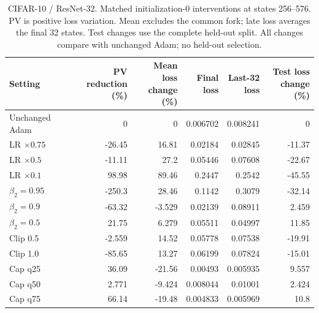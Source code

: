 \begin{table}[t]
\centering
\small
\setlength{\tabcolsep}{4pt}
\begin{tabular}{lrrrrr}
\toprule
Setting & \shortstack{PV reduction\\(\%)} & \shortstack{Mean loss\\change (\%)} & \shortstack{Final\\loss} & \shortstack{Last-32\\loss} & \shortstack{Test loss\\change (\%)} \\
\midrule
Unchanged Adam & 0 & 0 & 0.006702 & 0.008241 & 0 \\
LR $\times0.75$ & -26.45 & 16.81 & 0.02184 & 0.02845 & -11.37 \\
LR $\times0.5$ & -11.11 & 27.2 & 0.05446 & 0.07608 & -22.67 \\
LR $\times0.1$ & 98.98 & 89.46 & 0.2447 & 0.2542 & -45.55 \\
$\beta_2=0.95$ & -250.3 & 28.46 & 0.1142 & 0.3079 & -32.14 \\
$\beta_2=0.9$ & -63.32 & -3.529 & 0.02139 & 0.08911 & 2.459 \\
$\beta_2=0.5$ & 21.75 & 6.279 & 0.05511 & 0.04997 & 11.85 \\
Clip 0.5 & -2.559 & 14.52 & 0.05778 & 0.07538 & -19.91 \\
Clip 1.0 & -85.65 & 13.27 & 0.06199 & 0.07824 & -15.01 \\
Cap q25 & 36.09 & -21.56 & 0.00493 & 0.005935 & 9.557 \\
Cap q50 & 2.771 & -9.424 & 0.008044 & 0.01001 & 2.424 \\
Cap q75 & 66.14 & -19.48 & 0.004833 & 0.005969 & 10.8 \\
\bottomrule
\end{tabular}
\caption{CIFAR-10 / ResNet-32. Matched initialization-0 interventions at states 256--576. PV is positive loss variation. Mean excludes the common fork; late loss averages the final 32 states. Test changes use the complete held-out split. All changes compare with unchanged Adam; no held-out selection.}
\end{table}


